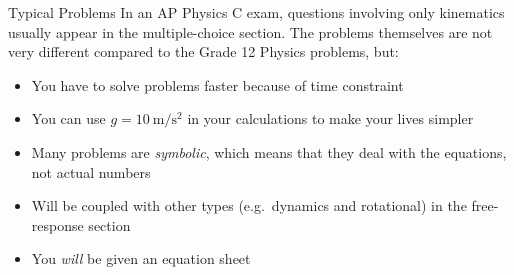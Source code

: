 \documentclass[12pt,compress,aspectratio=169,dvipsnames]{beamer}
\begin{document}
\begin{frame}{Typical Problems}
  In an AP Physics C exam, questions involving only kinematics usually appear
  in the multiple-choice section. The problems themselves are not very different
  compared to the Grade 12 Physics problems, but:
  \begin{itemize}
  \item You have to solve problems faster because of time constraint
  \item You can use $g=\SI{10}{\metre\per\second\squared}$
    in your calculations to make your lives simpler
  \item Many problems are \emph{symbolic}, which means that they deal with
    the equations, not actual numbers
  \item Will be coupled with other types (e.g.\ dynamics and rotational) in
    the free-response section
  \item You \emph{will} be given an equation sheet
  \end{itemize}
\end{frame}
\end{document}
